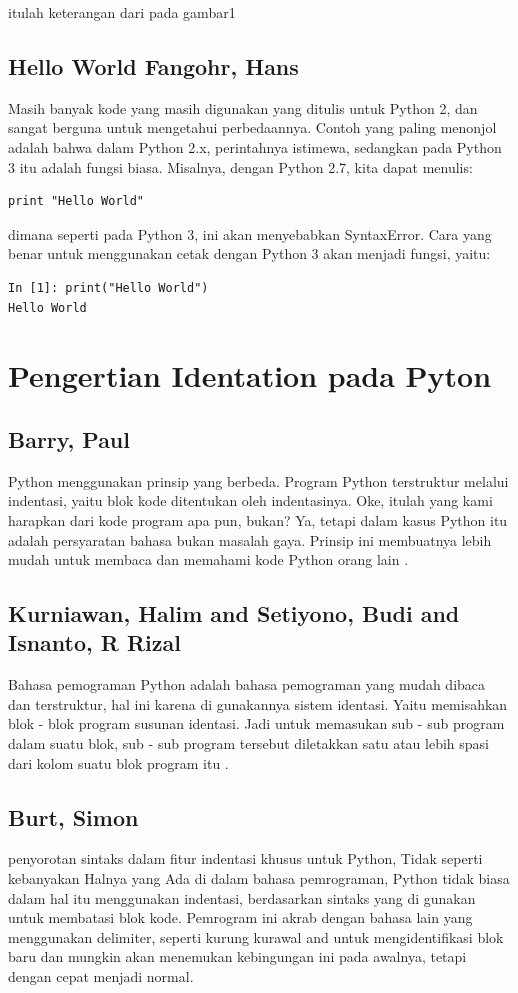 \documentclass[12pt]{article}
\begin{document}
itulah keterangan dari pada gambar1 \cite{parra2017scripting}

\subsection{Hello World Fangohr, Hans}
Masih banyak kode yang masih digunakan yang ditulis untuk Python 2, dan sangat berguna untuk mengetahui perbedaannya. Contoh yang paling menonjol adalah bahwa dalam Python 2.x, perintahnya istimewa, sedangkan pada Python 3 itu adalah fungsi biasa. Misalnya, dengan Python 2.7, kita dapat menulis:
\begin{verbatim}
print "Hello World"
\end{verbatim}
dimana seperti pada Python 3, ini akan menyebabkan SyntaxError. Cara yang benar untuk menggunakan cetak dengan Python 3 akan menjadi fungsi, yaitu:
\begin{verbatim}
In [1]: print("Hello World")
Hello World
\end{verbatim}
\cite{fangohr2015python}

 
\section{Pengertian Identation pada Pyton}

\subsection{Barry, Paul}
Python menggunakan prinsip yang berbeda. Program Python terstruktur melalui indentasi, yaitu blok kode ditentukan oleh indentasinya. Oke, itulah yang kami harapkan dari kode program apa pun, bukan? Ya, tetapi dalam kasus Python itu adalah persyaratan bahasa bukan masalah gaya. Prinsip ini membuatnya lebih mudah untuk membaca dan memahami kode Python orang lain \cite{barry2016head}.

\subsection{Kurniawan, Halim and Setiyono, Budi and Isnanto, R Rizal}
Bahasa pemograman Python adalah bahasa pemograman yang mudah dibaca dan terstruktur, hal ini karena di gunakannya sistem identasi. Yaitu memisahkan blok - blok program susunan identasi. Jadi untuk memasukan sub - sub program dalam suatu blok, sub - sub program tersebut diletakkan satu atau lebih spasi dari kolom suatu blok program itu \cite{kurniawan2011aplikasi}.

\subsection{Burt, Simon}
penyorotan sintaks dalam fitur indentasi khusus untuk Python, Tidak seperti kebanyakan Halnya yang Ada di dalam bahasa pemrograman, Python tidak biasa dalam hal itu menggunakan indentasi, berdasarkan sintaks yang di gunakan untuk membatasi blok kode. Pemrogram ini akrab dengan bahasa lain yang menggunakan delimiter, seperti kurung kurawal {and} untuk mengidentifikasi blok baru dan mungkin akan menemukan kebingungan ini pada awalnya, tetapi dengan cepat menjadi normal\cite{burtusing}.
\end{document}
